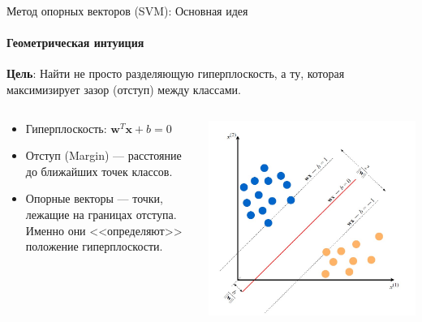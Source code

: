 \documentclass[notheorems, handout]{beamer}
\begin{document}
\begin{frame}{Метод опорных векторов (SVM): Основная идея}
  \framesubtitle{Геометрическая интуиция}

  \textbf{Цель}: Найти не просто разделяющую гиперплоскость, а ту,
  которая \alert{максимизирует зазор (отступ)} между классами.

  \begin{columns}
    \begin{column}{0.5\textwidth}
      \begin{itemize}
        \item Гиперплоскость: $\mathbf{w}^T \mathbf{x} + b = 0$
        \item \alert{Отступ (Margin)} — расстояние до ближайших точек классов.
        \item \alert{Опорные векторы} — точки, лежащие на границах
          отступа. Именно они <<определяют>> положение гиперплоскости.
      \end{itemize}
    \end{column}
    \begin{column}{0.5\textwidth}
      \includegraphics[width=\textwidth]{img/svm_margin.jpg}
    \end{column}
  \end{columns}
\end{frame}
\end{document}
